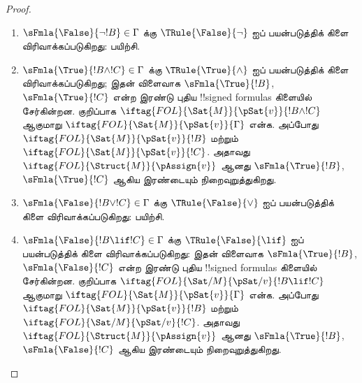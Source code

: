 \documentclass[../../../include/open-logic-section]{subfiles}
\begin{document}
\begin{proof}
\begin{enumerate}
\item $\sFmla{\False}{\lnot !B} \in \Gamma$ க்கு
  $\TRule{\False}{\lnot}$ ஐப் பயன்படுத்திக் கிளை விரிவாக்கப்படுகிறது:
  பயிற்சி.
\item $\sFmla{\True}{!B \land !C} \in \Gamma$ க்கு
  $\TRule{\True}{\land}$ ஐப் பயன்படுத்திக் கிளை விரிவாக்கப்படுகிறது;
  இதன் விளைவாக $\sFmla{\True}{!B}$, $\sFmla{\True}{!C}$ என்ற இரண்டு புதிய
  !!{signed formula}s கிளையில் சேர்கின்றன. குறிப்பாக
  $\iftag{FOL}{\Sat{M}}{\pSat{v}}{!B \land !C}$ ஆகுமாறு
  $\iftag{FOL}{\Sat{M}}{\pSat{v}}{\Gamma}$ என்க. அப்போது
  $\iftag{FOL}{\Sat{M}}{\pSat{v}}{!B}$ மற்றும்
  $\iftag{FOL}{\Sat{M}}{\pSat{v}}{!C}$. அதாவது
  $\iftag{FOL}{\Struct{M}}{\pAssign{v}}$ ஆனது
  $\sFmla{\True}{!B}$, $\sFmla{\True}{!C}$ ஆகிய இரண்டையும்
  நிறைவுறுத்துகிறது.
\item $\sFmla{\False}{!B \lor !C} \in \Gamma$ க்கு
  $\TRule{\False}{\lor}$ ஐப் பயன்படுத்திக் கிளை விரிவாக்கப்படுகிறது:
  பயிற்சி.
\item $\sFmla{\False}{!B \lif !C} \in \Gamma$ க்கு
  $\TRule{\False}{\lif}$ ஐப் பயன்படுத்திக் கிளை விரிவாக்கப்படுகிறது:
  இதன் விளைவாக $\sFmla{\True}{!B}$, $\sFmla{\False}{!C}$ என்ற இரண்டு புதிய
  !!{signed formula}s கிளையில் சேர்கின்றன. குறிப்பாக
  $\iftag{FOL}{\Sat/{M}}{\pSat/{v}}{!B \lif !C}$ ஆகுமாறு
  $\iftag{FOL}{\Sat{M}}{\pSat{v}}{\Gamma}$ என்க. அப்போது
  $\iftag{FOL}{\Sat{M}}{\pSat{v}}{!B}$ மற்றும்
  $\iftag{FOL}{\Sat/{M}}{\pSat/{v}}{!C}$. அதாவது
  $\iftag{FOL}{\Struct{M}}{\pAssign{v}}$ ஆனது
  $\sFmla{\True}{!B}$, $\sFmla{\False}{!C}$ ஆகிய இரண்டையும்
  நிறைவுறுத்துகிறது.

\end{enumerate}
\end{proof}
\end{document}
